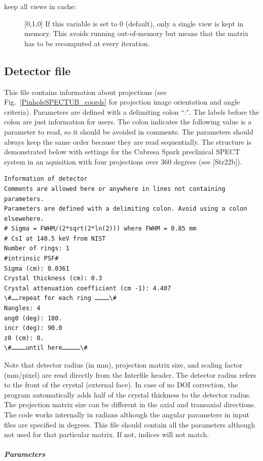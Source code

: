\documentclass{article}
\newcommand{\subsubsubsubsection}[1]{\subparagraph{#1} \mbox{} \\}
\begin{document}
{{\begin{description}
\item[keep all views in cache:] [0,1,0{]} If this variable is set to 0 (default), only a single view is kept in memory. This avoids running out-of-memory but means that the matrix has to be recomputed at every iteration.

\end{description}

{ {\subsection*{{Detector file} }
This file contains information about projections (see Fig.~\ref{PinholeSPECTUB_coords} for projection image orientation and angle criteria). Parameters are defined with a delimiting colon ``:". The labels before the colon are just information for users. The colon indicates the following value is a parameter to read, so it should be avoided in comments. The parameters should always keep the same order because they are read sequentially. The structure is demonstrated below with settings for the Cubresa Spark preclinical SPECT system in an aquisition with four projections over 360 degrees (see [Str22b]).

\begin{verbatim}
Information of detector
Comments are allowed here or anywhere in lines not containing parameters.
Parameters are defined with a delimiting colon. Avoid using a colon elsewehere.
# Sigma = FWHM/(2*sqrt(2*ln(2))) where FWHM = 0.85 mm
# CsI at 140.5 keV from NIST
Number of rings: 1
#intrinsic PSF#
Sigma (cm): 0.0361
Crystal thickness (cm): 0.3
Crystal attenuation coefficient (cm -1): 4.407   
\#……repeat for each ring …………\#
Nangles: 4
ang0 (deg): 180.
incr (deg): 90.0
z0 (cm): 0.
\#…………until here……………\#
\end{verbatim}

\noindent Note that detector radius (in mm), projection matrix size, and scaling factor (mm/pixel) are read directly from the Interfile header. The detector radius refers to the front of the crystal (external face). In case of no DOI correction, the program automatically adds half of the crystal thickness to the detector radius. The projection matrix size can be different in the axial and transaxial directions. The code works internally in radians although the angular parameters in input files are specified in degrees. This file should contain all the parameters although not used for that particular matrix. If not, indices will not match.

{ \subsubsubsubsection{Parameters} }
\begin{description}


\end{description}}}}}
\end{document}
